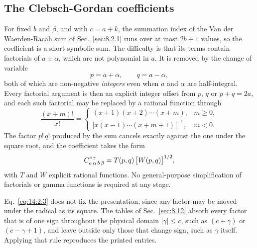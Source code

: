 \subsection{The Clebsch-Gordan coefficients}\label{sec:14.2.1}
For fixed $b$ and $\beta$, and with $c=a+k$, the summation index of the Van der
Waerden-Racah sum of Sec.~\ref{sec:8.2.1} runs over at most $2b+1$ values, so
the coefficient is a short symbolic sum. The difficulty is that its terms
contain factorials of $a\pm\alpha$, which are not polynomial in $a$. It is
removed by the change of variable
\begin{equation}
p=a+\alpha, \qquad q=a-\alpha ,\label{eq:14:2:1}
\end{equation}
both of which are non-negative \emph{integers} even when $a$ and $\alpha$ are
half-integral. Every factorial argument is then an explicit integer offset from
$p$, $q$ or $p+q=2a$, and each such factorial may be replaced by a rational
function through
\begin{equation}
\frac{(x+m)!}{x!}=
\begin{cases}
(x+1)(x+2)\cdots(x+m), & m \geq 0,\\[2pt]
\bigl[x(x-1)\cdots(x+m+1)\bigr]^{-1}, & m<0 .
\end{cases}\label{eq:14:2:2}
\end{equation}
The factor $p!\,q!$ produced by the sum cancels exactly against the one under
the square root, and the coefficient takes the form
\begin{equation}
C_{a\,\alpha\,b\,\beta}^{c\,\gamma}=T(p,q)\,\bigl[W(p,q)\bigr]^{1/2},
\label{eq:14:2:3}
\end{equation}
with $T$ and $W$ explicit rational functions. No general-purpose simplification
of factorials or gamma functions is required at any stage.

Eq.~\eqref{eq:14:2:3} does not fix the presentation, since any factor may be
moved under the radical as its square. The tables of Sec.~\ref{sec:8.12} absorb
every factor that is of one sign throughout the physical domain
$|\gamma| \leq c$, such as $(c+\gamma)$ or $(c-\gamma+1)$, and leave outside
only those that change sign, such as $\gamma$ itself. Applying that rule
reproduces the printed entries.

